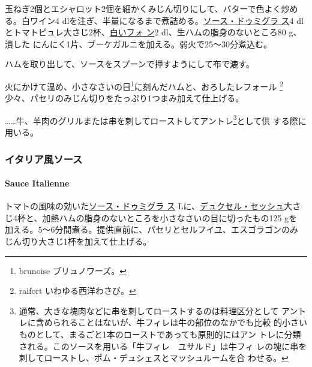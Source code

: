 \begin{recette}
  

玉ねぎ2個とエシャロット2個を細かくみじん切りにして、バターで色よく炒め
る。白ワイン4
dlを注ぎ、半量になるまで煮詰める。\protect\hyperlink{sauce-demi-glace}{ソース・ドゥミグラ
ス}4
dlとトマトピュレ大さじ2杯、\protect\hyperlink{fonds-blanc-ordinaire}{白いフォ
ン}2 dl、生ハムの脂身のないところ80 g、潰した
にんにく1片、ブーケガルニを加える。弱火で25〜30分煮込む。

ハムを取り出して、ソースをスプーンで押すようにして布で漉す。

火にかけて温め、小さなさいの目\footnote{brunoise ブリュノワーズ。}に刻んだハムと、おろしたレフォール
\footnote{raifort いわゆる西洋わさび。}少々、パセリのみじん切りをたっぷり1つまみ加えて仕上げる。

\ldots{}\ldots{}牛、羊肉のグリルまたは串を刺してローストしてアントレ\footnote{通常、大きな塊肉などに串を刺してローストするのは料理区分として
  アントレに含められることはないが、牛フィレは牛の部位のなかでも比較
  的小さいものとして、まるごと1本のローストであっても原則的にはアン
  トレに分類される。このソースを用いる「牛フィレ　ユサルド」は牛フィ
  レの塊に串を刺してローストし、ポム・デュシェスとマッシュルームを合
  わせる。}として供 する際に用いる。

\maeaki

\hypertarget{ux30a4ux30bfux30eaux30a2ux98a8ux30bdux30fcux30b9}{%
\subsubsection{イタリア風ソース}\label{ux30a4ux30bfux30eaux30a2ux98a8ux30bdux30fcux30b9}}

\hypertarget{sauce-italienne}{%
\paragraph{Sauce Italienne}\label{sauce-italienne}}

   

トマトの風味の効いた\protect\hyperlink{sauce-demi-glace}{ソース・ドゥミグラ
ス}\troisquarts{} Lに、\protect\hyperlink{}{デュクセル・セッシュ}大さ
じ4杯と、加熱ハムの脂身のないところを小さなさいの目に切ったもの125 gを
加える。5〜6分間煮る。提供直前に、パセリとセルフイユ、エスゴラゴンのみ
じん切り大さじ1杯を加えて仕上げる。


\end{recette}
